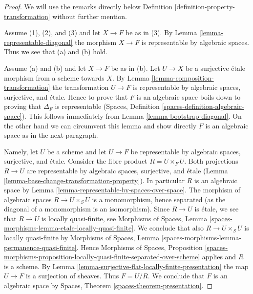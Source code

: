 \begin{proof}
We will use the remarks directly below
Definition \ref{definition-property-transformation}
without further mention.

\medskip\noindent
Assume (1), (2), and (3) and let $X \to F$ be as in (3).
By Lemma \ref{lemma-representable-diagonal} the morphism
$X \to F$ is representable by algebraic spaces. Thus
we see that (a) and (b) hold.

\medskip\noindent
Assume (a) and (b) and let $X \to F$ be as in (b).
Let $U \to X$ be a surjective \'etale morphism from a scheme towards $X$.
By Lemma \ref{lemma-composition-transformation} the transformation
$U \to F$ is representable by algebraic spaces, surjective, and \'etale.
Hence to prove that $F$ is an algebraic space boils down to proving that
$\Delta_F$ is representable (Spaces, Definition
\ref{spaces-definition-algebraic-space}). This follows immediately from
Lemma \ref{lemma-bootstrap-diagonal}.
On the other hand we can circumvent this lemma and show directly $F$
is an algebraic space as in the next paragraph.

\medskip\noindent
Namely, let $U$ be a scheme and let $U \to F$ be representable by algebraic
spaces, surjective, and \'etale. Consider the fibre product $R = U \times_F U$.
Both projections $R \to U$ are representable by algebraic spaces, surjective,
and \'etale (Lemma \ref{lemma-base-change-transformation-property}).
In particular $R$ is an algebraic space by
Lemma \ref{lemma-representable-by-spaces-over-space}.
The morphism of algebraic spaces $R \to U \times_S U$ is a monomorphism,
hence separated (as the diagonal of a monomorphism is an isomorphism).
Since $R \to U$ is \'etale, we see that $R \to U$ is locally quasi-finite, see
Morphisms of Spaces,
Lemma \ref{spaces-morphisms-lemma-etale-locally-quasi-finite}.
We conclude that also $R \to U \times_S U$ is
locally quasi-finite by
Morphisms of Spaces,
Lemma \ref{spaces-morphisms-lemma-permanence-quasi-finite}.
Hence
Morphisms of Spaces, Proposition
\ref{spaces-morphisms-proposition-locally-quasi-finite-separated-over-scheme}
applies and $R$ is a scheme. By
Lemma \ref{lemma-surjective-flat-locally-finite-presentation}
the map $U \to F$ is a surjection of sheaves. Thus $F = U/R$.
We conclude that $F$ is an algebraic space by
Spaces, Theorem \ref{spaces-theorem-presentation}.
\end{proof}









